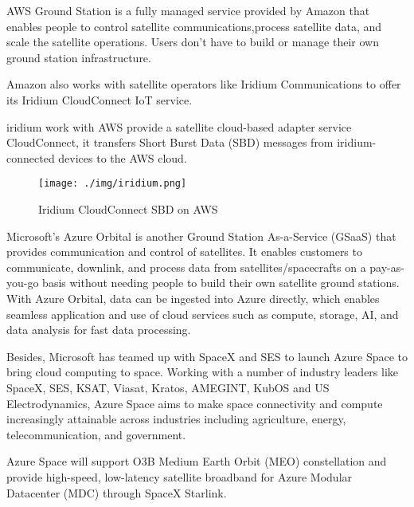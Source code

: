 \documentclass[12pt, draftclsnofoot, onecolumn]{IEEEtran}
\begin{document}
AWS Ground Station \cite{AWS} is a fully managed service provided by Amazon that enables people to control satellite communications,process satellite data, and scale the satellite operations.  Users don't have to build or manage their own ground station infrastructure. 

Amazon also works with satellite operators like Iridium Communications to offer its Iridium CloudConnect IoT service.

iridium work with AWS provide  a satellite cloud-based adapter service CloudConnect, it transfers Short Burst Data (SBD) messages from iridium-connected devices to the AWS cloud. 

\begin{figure}[H]
	\centering
	\texttt{[image: ./img/iridium.png]}
	\caption{Iridium CloudConnect SBD on AWS }

\end{figure}



Microsoft's Azure Orbital \cite{Azure} is another Ground Station As-a-Service (GSaaS) that provides communication and control of satellites. It enables customers to communicate, downlink, and process data from satellites/spacecrafts on a pay-as-you-go basis without needing people to build their own satellite ground stations. With Azure Orbital, data can be ingested into Azure directly, which enables seamless application and use of cloud services such as compute, storage, AI, and data analysis for fast data processing. 

Besides, Microsoft has teamed up with SpaceX and SES to launch Azure Space\cite{Azurespace} to bring cloud computing to space. Working with a number of industry leaders like SpaceX, SES, KSAT, Viasat, Kratos, AMEGINT, KubOS  and US Electrodynamics, Azure Space aims to make space connectivity and compute increasingly attainable across industries including agriculture, energy, telecommunication, and government.


Azure Space will support O3B Medium Earth Orbit (MEO) constellation and provide high-speed, low-latency satellite broadband for Azure Modular Datacenter (MDC) through SpaceX Starlink.
\end{document}
